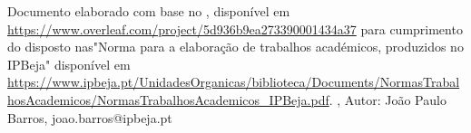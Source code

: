 \documentclass[PT]{ipbeja-format}
\begin{document}
\setcounter{page}{1}
\thispagestyle{empty} 
 
\pagestyle{ruled} 





%

\indicegeral  
\indicedefiguras %
\indicedetabelas %
\indicedelistagens %
% 
% 




%



\clearpage
\thispagestyle{empty}

\sloppy
\printbibliography[heading=subbibliography]
\thispagestyle{empty}

\apendices

\anexos



\vfill

\SingleSpacing
{\tiny Documento elaborado com base no , disponível em \url{https://www.overleaf.com/project/5d936b9ea273390001434a37} para cumprimento do disposto nas"Norma para a elaboração de trabalhos académicos, produzidos no IPBeja" disponível em \url{https://www.ipbeja.pt/UnidadesOrganicas/biblioteca/Documents/NormasTrabalhosAcademicos/NormasTrabalhosAcademicos_IPBeja.pdf}.
    \version, Autor: João Paulo Barros, joao.barros@ipbeja.pt}
\end{document}
